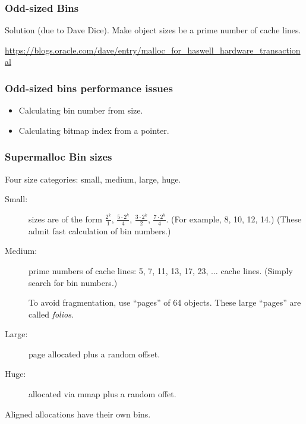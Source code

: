 \documentclass[xcolor=dvipsnames,14pt]{beamer}
\begin{document}
\begin{frame}
\frametitle{Odd-sized Bins}

Solution (due to Dave Dice).  Make object sizes be a prime number of cache lines.

\url{https://blogs.oracle.com/dave/entry/malloc_for_haswell_hardware_transactional}


\end{frame}

\begin{frame}
\frametitle{Odd-sized bins performance issues}

\begin{itemize}
\item Calculating bin number from size.
\item Calculating bitmap index from a pointer.
\end{itemize}
\end{frame}

\begin{frame}
\frametitle{Supermalloc Bin sizes}

Four size categories: small, medium, large, huge.

\begin{description}
\item[Small:] sizes are of the form $\frac{2^k}{1}$, $\frac{5 \cdot 2^k}{4}$, $\frac{3 \cdot 2^k}{2}$, $\frac{7 \cdot 2^k}{4}$.  
(For example, 8, 10, 12, 14.)  (These admit fast calculation of bin numbers.)

\item[Medium:] prime numbers of cache lines: 5, 7, 11, 13, 17, 23,
  $\ldots$ cache lines.  (Simply search for bin numbers.)

 To avoid fragmentation, use ``pages'' of 64 objects.  These large
 ``pages'' are called \textit{folios}.

\item[Large:] page allocated plus a random offset.

\item[Huge:] allocated via mmap plus a random offet.
\end{description}

Aligned allocations have their own bins.

\end{frame}
\end{document}
